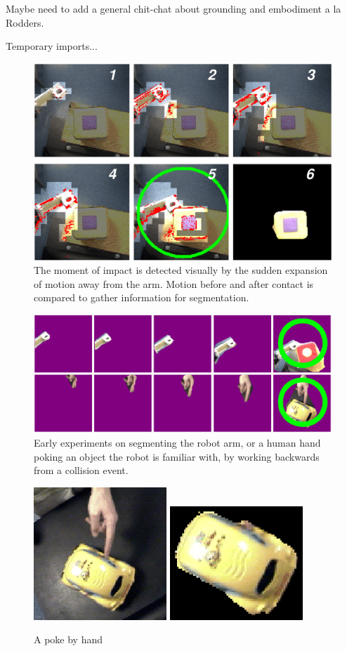 Maybe need to add a general chit-chat about grounding and embodiment
a la Rodders.

\ifverbose
Temporary imports...

\begin{figure}[tbh]
  \begin{center}
    \includegraphics[width=12cm]{collision-detail}
  \end{center}
  \caption{
    The moment of impact is detected visually by the
    sudden expansion of motion away from the arm.  Motion before and
    after contact is compared to gather information for segmentation.
}
\end{figure}

\begin{figure}[tbh]
  \centerline{\includegraphics[width=12cm]{manipulator-segment}}
  \caption{Early experiments on segmenting the robot arm, or a 
human hand poking an object the robot is familiar with, by working
backwards from a collision event.}
  \label{fig:manipulator}
\end{figure}

\begin{figure}[tbh]
  \centerline{
\includegraphics[width=5cm]{fig-car-hand-seg-src}
\hspace{1cm}
\includegraphics[width=5cm]{fig-car-hand-seg}
}
  \caption{A poke by hand}
  \label{fig:handpoke}
\end{figure}
\fi
